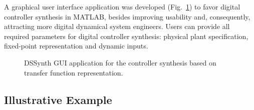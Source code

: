 \documentclass[10pt,conference]{IEEEtran}
\begin{document}
A graphical user interface application was developed (Fig.~\ref{fig:gui-for-tf}) 
to favor digital controller synthesis in MATLAB, besides improving usability and, 
consequently, attracting more digital dynamical system engineers. Users can provide all 
required parameters for digital controller synthesis: physical plant specification, 
fixed-point representation and dynamic inputs. 
%
\begin{figure}[ht]
    \centering
		\hfil
		\hfil
		\hfil
		\hfil
    \caption{DSSynth GUI application for the controller synthesis based on transfer function representation.}
    \label{fig:gui-for-tf}
\end{figure}

\subsection{Illustrative Example}
\end{document}
